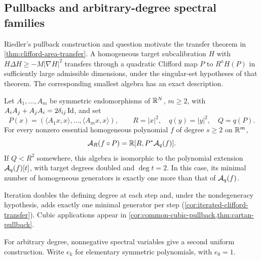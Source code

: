 \subsection{Pullbacks and arbitrary-degree spectral families}

Riedler's pullback construction and question
\cite[Theorem~5.2.5 and Question~5.3.3(2)]{RiedlerThesis25}
motivate the transfer theorem in \cref{thm:clifford-area-transfer}.
A homogeneous target subcalibration $H$ with
$H\Delta H\ge-M|\nabla H|^2$ transfers through a quadratic Clifford
map $P$ to $R^aH(P)$ in sufficiently large admissible dimensions,
under the singular-set hypotheses of that theorem.
The corresponding smallest algebra has an exact description.

\begin{maintheorem}
\label{main:clifford-smallest-algebra}
Let $A_1,\ldots,A_m$ be symmetric endomorphisms of $\mathbb R^N$, $m\ge2$,
with $A_iA_j+A_jA_i=2\delta_{ij}\operatorname{Id}$, and set
\[
 P(x)=(\langle A_1x,x\rangle,\ldots,\langle A_mx,x\rangle),
 \qquad R=|x|^2,\quad q(y)=|y|^2,\quad Q=q(P).
\]
For every nonzero essential homogeneous polynomial $f$ of degree
$s\ge2$ on $\mathbb R^m$,
\[
 \mathcal A_R(f\circ P)=\mathbb R[R,P^*\mathcal A_q(f)].
\]
If $Q<R^2$ somewhere, this algebra is isomorphic to the polynomial
extension $\mathcal A_q(f)[t]$, with target degrees doubled and $\deg t=2$.
In this case, its minimal number of homogeneous generators is
exactly one more than that of $\mathcal A_q(f)$.
\end{maintheorem}
Iteration doubles the defining degree at each step and, under the
nondegeneracy hypothesis, adds exactly one minimal generator per step
(\cref{cor:iterated-clifford-transfer}). Cubic applications appear in
\cref{cor:common-cubic-pullback,thm:cartan-pullback}.

For arbitrary degree, nonnegative spectral variables give a second
uniform construction. Write $e_k$ for elementary symmetric polynomials,
with $e_0=1$.

